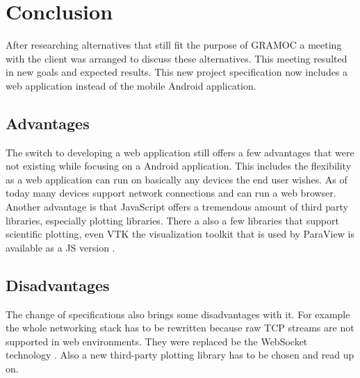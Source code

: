 \chapter{Conclusion}
After researching alternatives that still fit the purpose of GRAMOC a meeting with the client was arranged to discuss these alternatives. This meeting resulted in new goals and expected results. This new project specification now includes a web application instead of the mobile Android application.

\section{Advantages}
The switch to developing a web application still offers a few advantages that were not existing while focusing on a Android application. This includes the flexibility as a web application can run on basically any devices the end user wishes. As of today many devices support network connections and can run a web browser. Another advantage is that JavaScript offers a tremendous amount of third party libraries, especially plotting libraries. There a also a few libraries that support scientific plotting, even VTK the visualization toolkit that is used by ParaView is available as a JS version \cite{VTK}.

\section{Disadvantages}
The change of specifications also brings some disadvantages with it. For example the whole networking stack has to be rewritten because raw TCP streams are not supported in web environments. They were replaced be the WebSocket technology \cite{rfc6455}. Also a new third-party plotting library has to be chosen and read up on.

